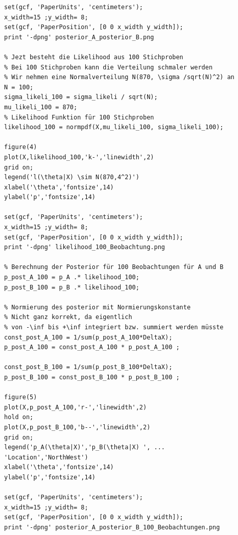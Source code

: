 \begin{verbatim}
set(gcf, 'PaperUnits', 'centimeters');
x_width=15 ;y_width= 8;
set(gcf, 'PaperPosition', [0 0 x_width y_width]);
print '-dpng' posterior_A_posterior_B.png

% Jezt besteht die Likelihood aus 100 Stichproben
% Bei 100 Stichproben kann die Verteilung schmaler werden
% Wir nehmen eine Normalverteilung N(870, \sigma /sqrt(N)^2) an
N = 100;
sigma_likeli_100 = sigma_likeli / sqrt(N);
mu_likeli_100 = 870;
% Likelihood Funktion für 100 Stichproben
likelihood_100 = normpdf(X,mu_likeli_100, sigma_likeli_100);

figure(4)
plot(X,likelihood_100,'k-','linewidth',2)
grid on;
legend('l(\theta|X) \sim N(870,4^2)')
xlabel('\theta','fontsize',14)
ylabel('p','fontsize',14)

set(gcf, 'PaperUnits', 'centimeters');
x_width=15 ;y_width= 8;
set(gcf, 'PaperPosition', [0 0 x_width y_width]);
print '-dpng' likelihood_100_Beobachtung.png

% Berechnung der Posterior für 100 Beobachtungen für A und B
p_post_A_100 = p_A .* likelihood_100;
p_post_B_100 = p_B .* likelihood_100;

% Normierung des posterior mit Normierungskonstante 
% Nicht ganz korrekt, da eigentlich 
% von -\inf bis +\inf integriert bzw. summiert werden müsste
const_post_A_100 = 1/sum(p_post_A_100*DeltaX);
p_post_A_100 = const_post_A_100 * p_post_A_100 ;

const_post_B_100 = 1/sum(p_post_B_100*DeltaX);
p_post_B_100 = const_post_B_100 * p_post_B_100 ;

figure(5)
plot(X,p_post_A_100,'r-','linewidth',2)
hold on;
plot(X,p_post_B_100,'b--','linewidth',2)
grid on;
legend('p_A(\theta|X)','p_B(\theta|X) ', ...
'Location','NorthWest')
xlabel('\theta','fontsize',14)
ylabel('p','fontsize',14)

set(gcf, 'PaperUnits', 'centimeters');
x_width=15 ;y_width= 8;
set(gcf, 'PaperPosition', [0 0 x_width y_width]);
print '-dpng' posterior_A_posterior_B_100_Beobachtungen.png
\end{verbatim} 
\newpage
